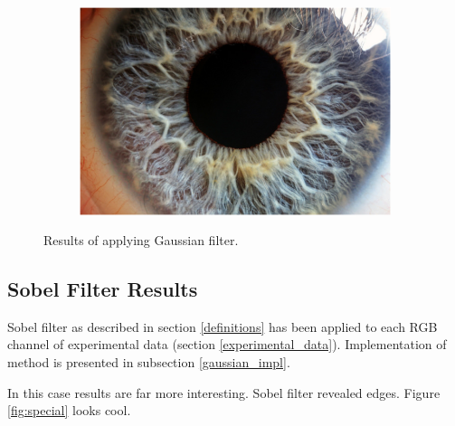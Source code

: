 \documentclass{article}
\begin{document}
\begin{figure}[H]
\begin{subfigure}{.09\textwidth}
\end{subfigure}%
\begin{subfigure}{.47\textwidth}
  \centering
  \includegraphics[width=0.97\linewidth]{_Figures/raw_data_4_gaussian.png}
  \caption{}
  \label{fig:raw_4_gaussian}
\end{subfigure}

\caption{Results of applying Gaussian filter. }
\label{fig:gaussian_results}
\end{figure}

%
%
\newpage
\subsection{Sobel Filter Results}
Sobel filter as described in section \ref{definitions} has been applied to each RGB channel of experimental data (section \ref{experimental_data}). Implementation of method is presented in subsection \ref{gaussian_impl}.

In this case results are far more interesting. Sobel filter revealed edges. Figure \ref{fig:special} looks cool.
\end{document}
